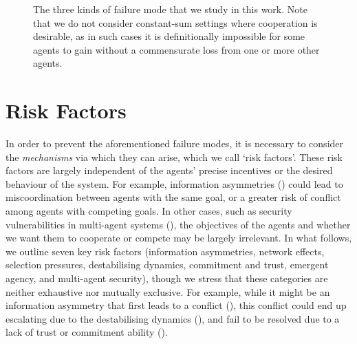 \documentclass[a4paper]{article}
\begin{document}
\begin{figure}[h]
    \centering
    \caption{The three kinds of failure mode that we study in this work. Note that we do not consider constant-sum settings where cooperation is desirable, as in such cases it is definitionally impossible for some agents to gain without a commensurate loss from one or more other agents.}
    \label{fig:terms}
\end{figure}





\section{Risk Factors}
\label{sec:failure_mechanisms}

In order to prevent the aforementioned failure modes, it is necessary to consider the \emph{mechanisms} via which they can arise, which we call `risk factors'.
These risk factors are largely independent of the agents' precise incentives or the desired behaviour of the system.
For example, information asymmetries () could lead to miscoordination between agents with the same goal, or a greater risk of conflict among agents with competing goals.
In other cases, such as security vulnerabilities in multi-agent systems (), the objectives of the agents and whether we want them to cooperate or compete may be largely irrelevant.
In what follows, we outline seven key risk factors (information asymmetries, network effects, selection pressures, destabilising dynamics, commitment and trust, emergent agency, and multi-agent security), though we stress that these categories are neither exhaustive nor mutually exclusive.
For example, while it might be an information asymmetry that first leads to a conflict (), this conflict could end up escalating due to the destabilising dynamics (), and fail to be resolved due to a lack of trust or commitment ability ().
\end{document}
